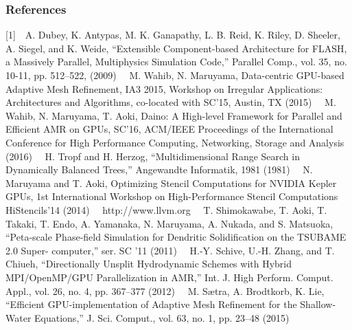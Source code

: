 \documentclass{book}
\begin{document}
\subsubsection{References}
[1]~~A. Dubey, K. Antypas, M. K. Ganapathy, L. B. Reid, K. Riley, D. Sheeler, A. Siegel, and K. Weide, “Extensible Component-based Architecture for FLASH, a Massively Parallel, Multiphysics Simulation Code,” Parallel Comp., vol. 35, no. 10-11, pp. 512–522, (2009) \newline
[2]~~M. Wahib, N. Maruyama, Data-centric GPU-based Adaptive Mesh Refinement, IA3 2015, Workshop on Irregular Applications: Architectures and Algorithms, co-located with SC’15, Austin, TX (2015) \newline
[3]~~M. Wahib, N. Maruyama, T. Aoki, Daino: A High-level Framework for Parallel and Efficient AMR on GPUs, SC'16, ACM/IEEE Proceedings of the International Conference for High Performance Computing, Networking, Storage and Analysis (2016) \newline
[4]~~H. Tropf and H. Herzog, “Multidimensional Range Search in Dynamically Balanced Trees,” Angewandte Informatik, 1981 (1981) \newline
[5]~~N. Maruyama and T. Aoki, Optimizing Stencil Computations for NVIDIA Kepler GPUs, 1st International Workshop on High-Performance Stencil Computations HiStencils'14 (2014) \newline
[6]~~http://www.llvm.org \newline
[7]~~T. Shimokawabe, T. Aoki, T. Takaki, T. Endo, A. Yamanaka, N. Maruyama, A. Nukada, and S. Matsuoka, “Peta-scale Phase-field Simulation for Dendritic Solidification on the TSUBAME 2.0 Super- computer,” ser. SC ’11 (2011)  \newline
[8]~~H.-Y. Schive, U.-H. Zhang, and T. Chiueh, “Directionally Unsplit Hydrodynamic Schemes with Hybrid MPI/OpenMP/GPU Parallelization in AMR,” Int. J. High Perform. Comput. Appl., vol. 26, no. 4, pp. 367–377 (2012)  \newline
[9]~~M. Sætra, A. Brodtkorb, K. Lie, “Efficient GPU-implementation of Adaptive Mesh Refinement for the Shallow-Water Equations,” J. Sci. Comput., vol. 63, no. 1, pp. 23–48 (2015)
\end{document}
